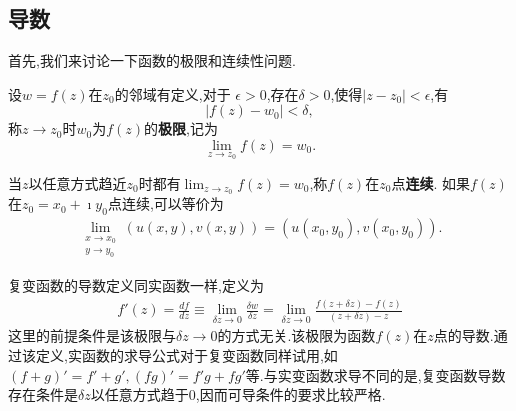 \subsection{导数}

首先,我们来讨论一下函数的极限和连续性问题.
\begin{Definition}
    设$w=f(z)$在$z_0$的邻域有定义,对于
$\epsilon > 0$,存在$\delta > 0$,使得$|z-z_0| < \epsilon$,有
\begin{equation}
    |f(z) - w_0| < \delta ,
\end{equation}
称$z\to z_0$时$w_0$为$f(z)$的{\bf 极限},记为
\begin{equation}
    \lim_{z\to z_0} f(z) = w_0 .
\end{equation}
\end{Definition}
当$z$以任意方式趋近$z_0$时都有$ \lim_{z\to z_0} f(z) = w_0$,称$f(z)$在$z_0$点{\bf 连续}.
如果$f(z)$ 在$z_0=x_0 + \imath y_0$点连续,可以等价为
\begin{align}
    \lim_{\substack{x\to x_0\\y\to y_0}} \left(u(x,y), v(x,y)\right) = \left(u(x_0, y_0), v(x_0, y_0)\right) . 
\end{align}

复变函数的导数定义同实函数一样,定义为
\begin{align}
    \label{eq:derivative_def}
    f'(z) = \frac{df}{dz} 
    \equiv\lim_{\delta z \to 0} \frac{\delta w} {\delta z} 
    = \lim_{\delta z\to 0} \frac{f(z+\delta z) - f(z) } {(z+\delta z ) - z}
\end{align}
这里的前提条件是该极限与$\delta z \to 0$的方式无关.该极限为函数$f(z)$在$z$点的导数.通过该定义,实函数的求导公式对于复变函数同样试用,如
$(f+g)' = f' + g', (fg)' =f'g + fg'$等.与实变函数求导不同的是,复变函数导数存在条件是$\delta z$以任意方式趋于$0$,因而可导条件的要求比较严格.

